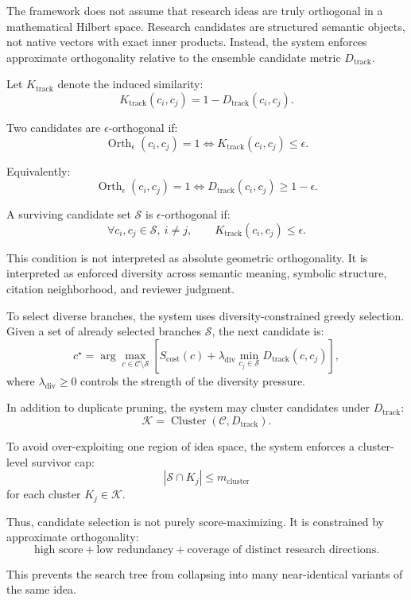 \documentclass[11pt]{article}
\begin{document}
The framework does not assume that research ideas are truly orthogonal in a mathematical Hilbert space. Research candidates are structured semantic objects, not native vectors with exact inner products. Instead, the system enforces approximate orthogonality relative to the ensemble candidate metric $D_{\text{track}}$.

Let $K_{\text{track}}$ denote the induced similarity:
$$
K_{\text{track}}(c_i,c_j)=1-D_{\text{track}}(c_i,c_j).
$$

Two candidates are $\epsilon$-orthogonal if:
$$
\operatorname{Orth}_{\epsilon}(c_i,c_j)=1
\Longleftrightarrow
K_{\text{track}}(c_i,c_j)\leq \epsilon.
$$

Equivalently:
$$
\operatorname{Orth}_{\epsilon}(c_i,c_j)=1
\Longleftrightarrow
D_{\text{track}}(c_i,c_j)\geq 1-\epsilon.
$$

A surviving candidate set $\mathcal{S}$ is $\epsilon$-orthogonal if:
$$
\forall c_i,c_j\in\mathcal{S},\ i\neq j,
\qquad
K_{\text{track}}(c_i,c_j)\leq \epsilon.
$$

This condition is not interpreted as absolute geometric orthogonality. It is interpreted as enforced diversity across semantic meaning, symbolic structure, citation neighborhood, and reviewer judgment.

To select diverse branches, the system uses diversity-constrained greedy selection. Given a set of already selected branches $\mathcal{S}$, the next candidate is:
$$
c^\star = \arg\max_{c\in\mathcal{C}\setminus\mathcal{S}}
\left[
S_{\text{cost}}(c)
+
\lambda_{\text{div}}
\min_{c_j\in\mathcal{S}}
D_{\text{track}}(c,c_j)
\right],
$$
where $\lambda_{\text{div}}\geq0$ controls the strength of the diversity pressure.

In addition to duplicate pruning, the system may cluster candidates under $D_{\text{track}}$:
$$
\mathcal{K} = \operatorname{Cluster}(\mathcal{C},D_{\text{track}}).
$$

To avoid over-exploiting one region of idea space, the system enforces a cluster-level survivor cap:
$$
|\mathcal{S}\cap K_j|\leq m_{\text{cluster}}
$$
for each cluster $K_j\in\mathcal{K}$.

Thus, candidate selection is not purely score-maximizing. It is constrained by approximate orthogonality:
$$
\text{high score}
+
\text{low redundancy}
+
\text{coverage of distinct research directions}.
$$

This prevents the search tree from collapsing into many near-identical variants of the same idea.
\end{document}
